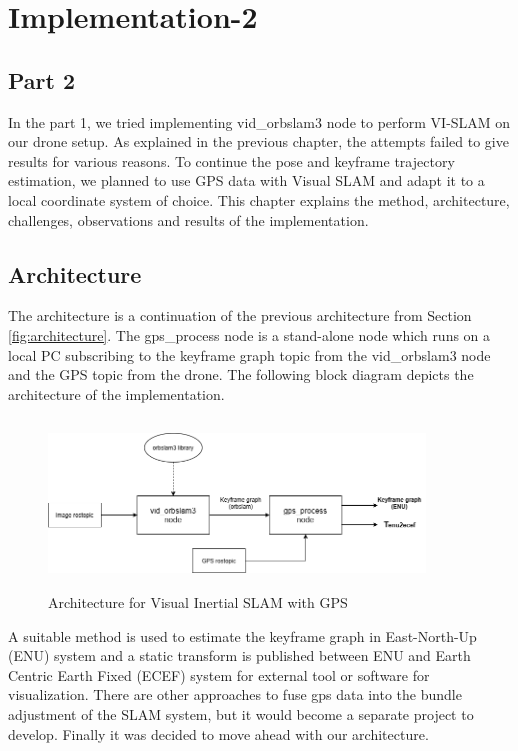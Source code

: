 \chapter{Implementation-2}
\label{ch:implementation2}
\section*{Part 2}
\label{sec:part2}
In the part 1, we tried implementing vid\_orbslam3 node to perform VI-SLAM on our drone setup. As explained in the previous chapter, the attempts failed to give results for various reasons. To continue the pose and keyframe trajectory estimation, we planned to use GPS data with Visual SLAM and adapt it to a local coordinate system of choice. This chapter explains the method, architecture, challenges, observations and results of the implementation.

\section{Architecture}
\label{sec:architecture2}
The architecture is a continuation of the previous architecture from Section \ref{fig:architecture}. The gps\_process node is a stand-alone node which runs on a local PC subscribing to the keyframe graph topic from the vid\_orbslam3 node and the GPS topic from the drone. The following block diagram depicts the architecture of the implementation.

\begin{figure}[h]
    \centering
    \includegraphics[height=4.5cm, width=10cm]{Images/archi2.png}
    \caption{Architecture for Visual Inertial SLAM with GPS}
    \label{fig:archi2blk}
\end{figure}

A suitable method is used to estimate the keyframe graph in East-North-Up (ENU) system and a static transform is published between ENU and Earth Centric Earth Fixed (ECEF) system for external tool or software for visualization. There are other approaches to fuse gps data into the bundle adjustment of the SLAM system, but it would become a separate project to develop. Finally it was decided to move ahead with our architecture.

